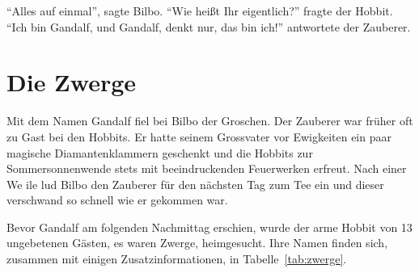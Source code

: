 \documentclass[a4paper, 12pt]{scrartcl}
\begin{document}
\enquote{Alles auf einmal}, sagte Bilbo. \enquote{Wie heißt Ihr
  eigentlich?} fragte der Hobbit. \enquote{Ich bin Gandalf, und Gandalf,
denkt nur, das bin ich!} antwortete der Zauberer.
%
\section{Die Zwerge}
Mit dem Namen Gandalf fiel bei Bilbo der Groschen. Der Zauberer war
früher oft zu Gast bei den Hobbits. Er hatte seinem Grossvater vor
Ewigkeiten ein paar magische Diamantenklammern geschenkt und die
Hobbits zur Sommersonnenwende stets mit beeindruckenden Feuerwerken
erfreut. Nach einer We
ile lud Bilbo den Zauberer für den nächsten Tag
zum Tee ein und dieser verschwand so schnell wie er gekommen war.
 
Bevor Gandalf am folgenden Nachmittag erschien, wurde der arme Hobbit
von 13 ungebetenen Gästen, es waren Zwerge, heimgesucht. Ihre Namen
finden sich, zusammen mit einigen Zusatzinformationen, in
Tabelle~\ref{tab:zwerge}.
% 
%
\end{document}

